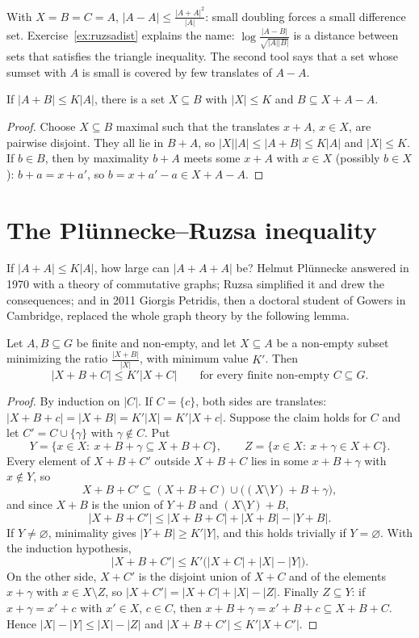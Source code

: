 With $X=B=C=A$, $|A-A|\le\frac{|A+A|^2}{|A|}$: small doubling forces a small difference set. Exercise~\ref{ex:ruzsadist} explains the name: $\log\frac{|A-B|}{\sqrt{|A||B|}}$ is a distance between sets that satisfies the triangle inequality. The second tool says that a set whose sumset with $A$ is small is covered by few translates of $A-A$.

\begin{lemma}\label{lem:covering}
If $|A+B|\le K|A|$, there is a set $X\subseteq B$ with $|X|\le K$ and $B\subseteq X+A-A$.
\end{lemma}
\begin{proof}
Choose $X\subseteq B$ maximal such that the translates $x+A$, $x\in X$, are pairwise disjoint. They all lie in $B+A$, so $|X||A|\le|A+B|\le K|A|$ and $|X|\le K$. If $b\in B$, then by maximality $b+A$ meets some $x+A$ with $x\in X$ (possibly $b\in X$): $b+a=x+a'$, so $b=x+a'-a\in X+A-A$.
\end{proof}

\section{The Plünnecke--Ruzsa inequality}

If $|A+A|\le K|A|$, how large can $|A+A+A|$ be? Helmut Plünnecke answered in 1970 with a theory of commutative graphs; Ruzsa simplified it and drew the consequences; and in 2011 Giorgis Petridis, then a doctoral student of Gowers in Cambridge, replaced the whole graph theory by the following lemma.

\begin{lemma}[Petridis]\label{lem:petridis}
Let $A,B\subseteq G$ be finite and non-empty, and let $X\subseteq A$ be a non-empty subset minimizing the ratio $\frac{|X+B|}{|X|}$, with minimum value $K'$. Then
\[
|X+B+C|\le K'|X+C|\qquad\text{for every finite non-empty }C\subseteq G.
\]
\end{lemma}
\begin{proof}
By induction on $|C|$. If $C=\{c\}$, both sides are translates: $|X+B+c|=|X+B|=K'|X|=K'|X+c|$.
Suppose the claim holds for $C$ and let $C'=C\cup\{\gamma\}$ with $\gamma\notin C$. Put
\[
Y=\{x\in X:\ x+B+\gamma\subseteq X+B+C\},\qquad Z=\{x\in X:\ x+\gamma\in X+C\}.
\]
Every element of $X+B+C'$ outside $X+B+C$ lies in some $x+B+\gamma$ with $x\notin Y$, so
\[
X+B+C'\subseteq(X+B+C)\cup\bigl((X\setminus Y)+B+\gamma\bigr),
\]
and since $X+B$ is the union of $Y+B$ and $(X\setminus Y)+B$,
\[
|X+B+C'|\le|X+B+C|+|X+B|-|Y+B|.
\]
If $Y\neq\varnothing$, minimality gives $|Y+B|\ge K'|Y|$, and this holds trivially if $Y=\varnothing$. With the induction hypothesis,
\[
|X+B+C'|\le K'\bigl(|X+C|+|X|-|Y|\bigr).
\]
On the other side, $X+C'$ is the disjoint union of $X+C$ and of the elements $x+\gamma$ with $x\in X\setminus Z$, so $|X+C'|=|X+C|+|X|-|Z|$. Finally $Z\subseteq Y$: if $x+\gamma=x'+c$ with $x'\in X$, $c\in C$, then $x+B+\gamma=x'+B+c\subseteq X+B+C$. Hence $|X|-|Y|\le|X|-|Z|$ and $|X+B+C'|\le K'|X+C'|$.
\end{proof}

